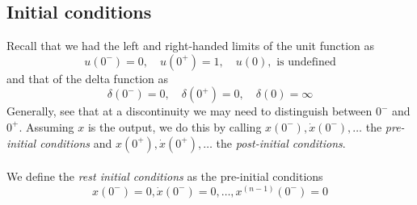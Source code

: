 \documentclass{report}
\begin{document}
\subsection{Initial conditions}
Recall that we had the left and right-handed limits of
the unit function as
\begin{equation*}
u(0^-)=0,\quad u(0^+)=1,\quad u(0),\text{ is undefined}
\end{equation*}
and that of the delta function as
\begin{equation*}
\delta(0^-)=0,\quad\delta(0^+)=0,\quad\delta(0)=\infty
\end{equation*}
Generally, see that at a discontinuity we may need to distinguish between $0^-$ and $0^+$. Assuming $x$ is the output, we
do this by calling $x(0^-),\dot{x}(0^-),\ldots$ the \textit{pre-initial conditions} and 
$x(0^+),\dot{x}(0^+),\ldots$ the \textit{post-initial conditions}.\\
\vspace{1mm}\\
We define the \textit{rest initial conditions} as the pre-initial conditions
\begin{equation*}
x(0^-)=0,\dot{x}(0^-)=0,\ldots,x^{(n-1)}(0^-)=0
\end{equation*}
\newpage
\end{document}
